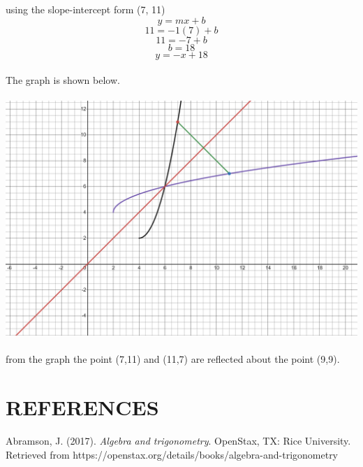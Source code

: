 \documentclass{article}
\begin{document}
using the slope-intercept form (7, 11)
$${y = mx + b}$$
$${11 = -1(7) + b}$$
$${11 = -7 + b}$$
$${b = 18}$$
$${y = -x + 18}$$
\\The graph is shown below.\\
\\\includegraphics[scale = 0.15]{wa4Q3}\\
\\from the graph the point (7,11) and (11,7) are reflected about the point (9,9).

\section*{REFERENCES}
Abramson, J. (2017). \textit{Algebra and trigonometry}. OpenStax, TX: Rice University. Retrieved
from https://openstax.org/details/books/algebra-and-trigonometry
\end{document}
